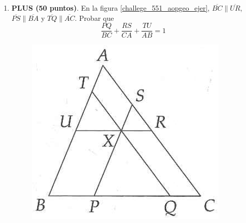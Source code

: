 \begin{enumerate}
	\item \textbf{PLUS (50 puntos)}. En la figura \ref{challege_551_aopgeo_ejer},  $\overline{BC} \parallel \overline{UR}$, $\overline{PS} \parallel \overline{BA}$ y $\overline{TQ} \parallel \overline{AC}$. Probar que
	\[
	\frac{PQ}{BC} + \frac{RS}{CA} + \frac{TU}{AB} = 1
	\]
	\begin{figure}[H]
		\centering
		\includegraphics[width=0.5\linewidth]{2020_10_31/imgs/challege_551_aopgeo_ejer}		
	\end{figure}

\end{enumerate}